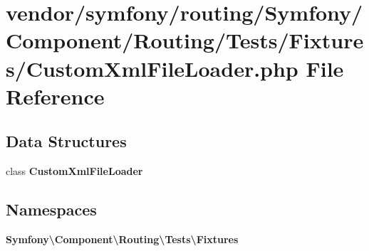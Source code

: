 \section{vendor/symfony/routing/\+Symfony/\+Component/\+Routing/\+Tests/\+Fixtures/\+Custom\+Xml\+File\+Loader.php File Reference}
\label{_custom_xml_file_loader_8php}
\subsection*{Data Structures}
\begin{DoxyCompactItemize}
\item 
class {\bf Custom\+Xml\+File\+Loader}
\end{DoxyCompactItemize}
\subsection*{Namespaces}
\begin{DoxyCompactItemize}
\item 
 {\bf Symfony\textbackslash{}\+Component\textbackslash{}\+Routing\textbackslash{}\+Tests\textbackslash{}\+Fixtures}
\end{DoxyCompactItemize}
